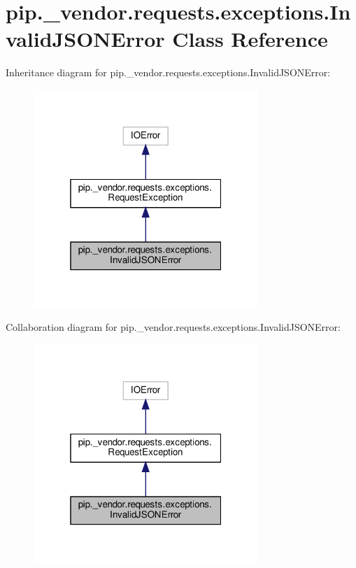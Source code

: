 \hypertarget{classpip_1_1__vendor_1_1requests_1_1exceptions_1_1InvalidJSONError}{}\section{pip.\+\_\+vendor.\+requests.\+exceptions.\+Invalid\+J\+S\+O\+N\+Error Class Reference}
\label{classpip_1_1__vendor_1_1requests_1_1exceptions_1_1InvalidJSONError}


Inheritance diagram for pip.\+\_\+vendor.\+requests.\+exceptions.\+Invalid\+J\+S\+O\+N\+Error\+:
\nopagebreak
\begin{figure}[H]
\begin{center}
\leavevmode
\includegraphics[width=241pt]{classpip_1_1__vendor_1_1requests_1_1exceptions_1_1InvalidJSONError__inherit__graph}
\end{center}
\end{figure}


Collaboration diagram for pip.\+\_\+vendor.\+requests.\+exceptions.\+Invalid\+J\+S\+O\+N\+Error\+:
\nopagebreak
\begin{figure}[H]
\begin{center}
\leavevmode
\includegraphics[width=241pt]{classpip_1_1__vendor_1_1requests_1_1exceptions_1_1InvalidJSONError__coll__graph}
\end{center}
\end{figure}
